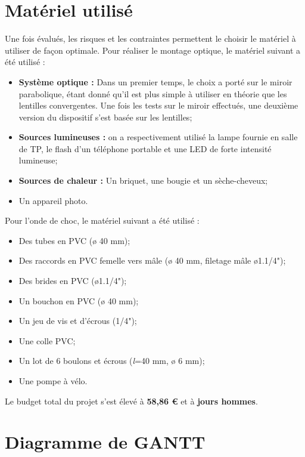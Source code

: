 \section{Matériel utilisé}
Une fois évalués, les risques et les contraintes permettent le choisir le matériel à utiliser de façon optimale. Pour réaliser le montage optique, le matériel suivant a été utilisé :
\begin{itemize}
	\item\textbf{Système optique :} Dans un premier temps, le choix a porté sur le miroir parabolique, étant donné qu'il est plus simple à utiliser en théorie que les lentilles convergentes. Une fois les tests sur le miroir effectués, une deuxième version du dispositif s'est basée sur les lentilles;
	\item\textbf{Sources lumineuses :} on a respectivement utilisé la lampe fournie en salle de TP, le flash d'un téléphone portable et une LED de forte intensité lumineuse;
	\item\textbf{Sources de chaleur :} Un briquet, une bougie et un sèche-cheveux;
	\item Un appareil photo.
\end{itemize}
Pour l'onde de choc, le matériel suivant a été utilisé :
\begin{itemize}
	\item Des tubes en PVC (ø 40 mm);
	\item Des raccords en PVC femelle vers mâle (ø 40 mm, filetage mâle ø1.1/4");
	\item Des brides en PVC (ø1.1/4");
	\item Un bouchon en PVC (ø 40 mm);
	\item Un jeu de vis et d'écrous (1/4");
	\item Une colle PVC;
	\item Un lot de 6 boulons et écrous (\textit{l}=40 mm, ø 6 mm);
	\item Une pompe à vélo.
\end{itemize}
Le budget total du projet s'est élevé à \textbf{58,86 €} et à \textbf{jours hommes}.
\section{Diagramme de GANTT}
